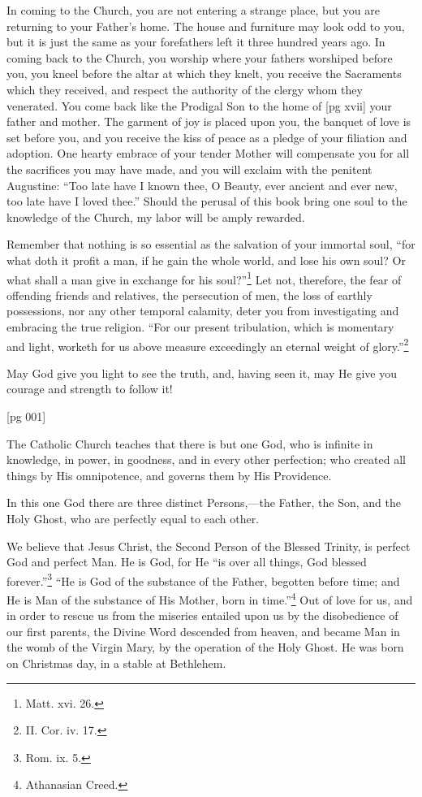 In coming to the Church, you are not entering a
strange place, but you are returning to your
Father's home. The house and furniture may
look odd to you, but it is just the same as your
forefathers left it three hundred years ago. In
coming back to the Church, you worship where
your fathers worshiped before you, you kneel before
the altar at which they knelt, you receive the
Sacraments which they received, and respect the
authority of the clergy whom they venerated. You
come back like the Prodigal Son to the home of
[pg xvii]
your father and mother. The garment of joy is
placed upon you, the banquet of love is set before
you, and you receive the kiss of peace as a pledge
of your filiation and adoption. One hearty embrace
of your tender Mother will compensate you
for all the sacrifices you may have made, and you
will exclaim with the penitent Augustine: “Too
late have I known thee, O Beauty, ever ancient and
ever new, too late have I loved thee.” Should the
perusal of this book bring one soul to the knowledge
of the Church, my labor will be amply rewarded.

Remember that nothing is so essential as the salvation
of your immortal soul, “for what doth it
profit a man, if he gain the whole world, and lose
his own soul? Or what shall a man give in exchange
for his soul?”\footnote{Matt. xvi. 26.} Let not, therefore, the
fear of offending friends and relatives, the persecution
of men, the loss of earthly possessions, nor
any other temporal calamity, deter you from investigating
and embracing the true religion. “For
our present tribulation, which is momentary and
light, worketh for us above measure exceedingly
an eternal weight of glory.”\footnote{II. Cor. iv. 17.}

May God give you light to see the truth, and,
having seen it, may He give you courage and
strength to follow it!

[pg 001]


The Catholic Church teaches that there is but
one God, who is infinite in knowledge, in
power, in goodness, and in every other perfection;
who created all things by His omnipotence,
and governs them by His Providence.

In this one God there are three distinct Persons,—the
Father, the Son, and the Holy Ghost, who
are perfectly equal to each other.

We believe that Jesus Christ, the Second Person
of the Blessed Trinity, is perfect God and perfect
Man. He is God, for He “is over all things,
God blessed forever.”\footnote{Rom. ix. 5.}
“He is God of the substance
of the Father, begotten before time; and
He is Man of the substance of His Mother, born in
time.”\footnote{Athanasian
Creed.} Out of love for us, and in order to rescue
us from the miseries entailed upon us by the disobedience
of our first parents, the Divine Word
descended from heaven, and became Man in the
womb of the Virgin Mary, by the operation of the
Holy Ghost. He was born on Christmas day, in
a stable at Bethlehem.

